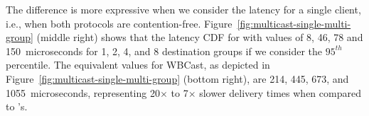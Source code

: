 The difference is more expressive when we consider the latency for a single client, i.e., when both protocols are contention-free. Figure~\ref{fig:multicast-single-multi-group} (middle right) shows that the latency CDF for \libname with values of 8, 46, 78 and 150~microseconds for 1, 2, 4, and 8 destination groups if we consider the $95^{th}$ percentile. 
The equivalent values for WBCast, as depicted in Figure~\ref{fig:multicast-single-multi-group} (bottom right), are 214, 445, 673, and 1055~microseconds, representing 20$\times$ to 7$\times$ slower delivery times when compared to \libname's.


